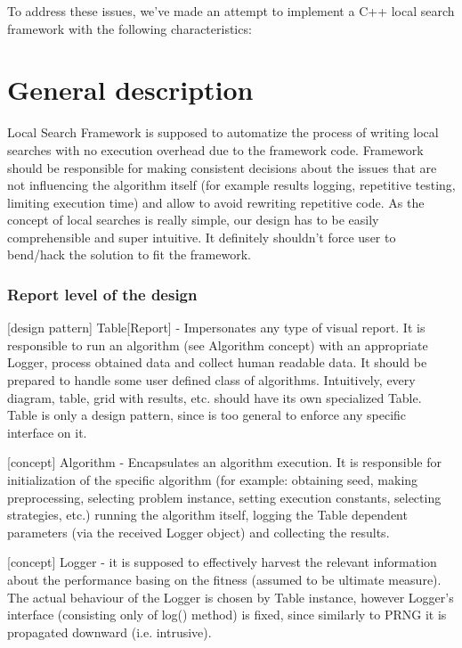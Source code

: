 To address these issues, we've made an attempt to implement a C++ local search 
framework with the following characteristics:

\section{General description}

Local Search Framework is supposed to automatize the process of writing local searches with no execution overhead due to the framework code.
Framework should be responsible for making consistent decisions about the issues that are not influencing the algorithm itself
(for example results logging, repetitive testing, limiting execution time) and allow to avoid rewriting repetitive code.
As the concept of local searches is really simple, our design has to be easily comprehensible and super intuitive.
It definitely shouldn't force user to bend/hack the solution to fit the framework.

\subsubsection{Report level of the design}

[design pattern] Table[Report] - Impersonates any type of visual report. It is responsible to run an algorithm (see Algorithm concept) with an appropriate Logger,
	process obtained data and collect human readable data. It should be prepared to handle some user defined class of algorithms.
	Intuitively, every diagram, table, grid with results, etc. should have its own specialized Table.
	Table is only a design pattern, since is too general to enforce any specific interface on it.

[concept] Algorithm - Encapsulates an algorithm execution. It is responsible for initialization of
	the specific algorithm (for example: obtaining seed, making preprocessing, selecting problem instance, setting execution constants,
	selecting strategies, etc.) running the algorithm itself, logging the Table dependent parameters (via the received Logger object)
	and collecting the results.

[concept] Logger - it is supposed to effectively harvest the relevant information about the performance basing on the fitness (assumed to be ultimate measure).
	The actual behaviour of the Logger is chosen by Table instance, however Logger's interface (consisting only of log() method) is fixed,
	since similarly to PRNG it is propagated downward (i.e. intrusive).

